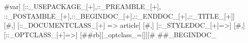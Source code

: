 {#var] [::_USEPACKAGE_[+],::_PREAMBLE_[+], ::_POSTAMBLE_[+],::_BEGINDOC_[+],::_ENDDOC_[+],::_TITLE_[+]]
[#,] [::_DOCUMENTCLASS_[+] => article]
[#,] [::_STYLEDOC_[+]=>] 
[#,] [::_OPTCLASS_[+]=>]
[#}{#rb][_optclass_=[]][#}
##{_BEGINDOC_}
